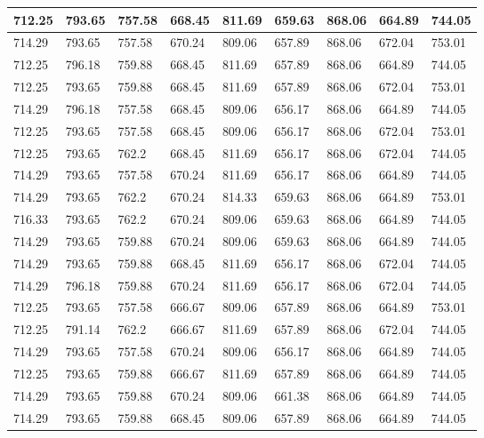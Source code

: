 \begin{longtable}{|l|l|l|l|l|l|l|l|l|}
		712.25   & 793.65  & 757.58  & 668.45  & 811.69 & 659.63  & 868.06   & 664.89  & 744.05  \\ \hline
		714.29   & 793.65  & 757.58  & 670.24  & 809.06 & 657.89  & 868.06   & 672.04  & 753.01  \\ \hline
		712.25   & 796.18  & 759.88  & 668.45  & 811.69 & 657.89  & 868.06   & 664.89  & 744.05  \\ \hline
		712.25   & 793.65  & 759.88  & 668.45  & 811.69 & 657.89  & 868.06   & 672.04  & 753.01  \\ \hline
		714.29   & 796.18  & 757.58  & 668.45  & 809.06 & 656.17  & 868.06   & 664.89  & 744.05  \\ \hline
		712.25   & 793.65  & 757.58  & 668.45  & 809.06 & 656.17  & 868.06   & 672.04  & 753.01  \\ \hline
		712.25   & 793.65  & 762.2   & 668.45  & 811.69 & 656.17  & 868.06   & 672.04  & 744.05  \\ \hline
		714.29   & 793.65  & 757.58  & 670.24  & 811.69 & 656.17  & 868.06   & 664.89  & 744.05  \\ \hline
		714.29   & 793.65  & 762.2   & 670.24  & 814.33 & 659.63  & 868.06   & 664.89  & 753.01  \\ \hline
		716.33   & 793.65  & 762.2   & 670.24  & 809.06 & 659.63  & 868.06   & 664.89  & 744.05  \\ \hline
		714.29   & 793.65  & 759.88  & 670.24  & 809.06 & 659.63  & 868.06   & 664.89  & 744.05  \\ \hline
		714.29   & 793.65  & 759.88  & 668.45  & 811.69 & 656.17  & 868.06   & 672.04  & 744.05  \\ \hline
		714.29   & 796.18  & 759.88  & 670.24  & 811.69 & 656.17  & 868.06   & 672.04  & 744.05  \\ \hline
		712.25   & 793.65  & 757.58  & 666.67  & 809.06 & 657.89  & 868.06   & 664.89  & 753.01  \\ \hline
		712.25   & 791.14  & 762.2   & 666.67  & 811.69 & 657.89  & 868.06   & 672.04  & 744.05  \\ \hline
		714.29   & 793.65  & 757.58  & 670.24  & 809.06 & 656.17  & 868.06   & 664.89  & 744.05  \\ \hline
		712.25   & 793.65  & 759.88  & 666.67  & 811.69 & 657.89  & 868.06   & 664.89  & 744.05  \\ \hline
		714.29   & 793.65  & 759.88  & 670.24  & 809.06 & 661.38  & 868.06   & 664.89  & 744.05  \\ \hline
		714.29   & 793.65  & 759.88  & 668.45  & 809.06 & 657.89  & 868.06   & 664.89  & 744.05  \\ \hline

\end{longtable}
